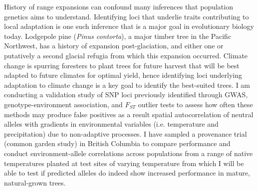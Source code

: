 	History of range expansions can confound many inferences that population genetics aims to understand. Identifying loci that underlie traits contributing to local adaptation is one such inference that is a major goal in evolutionary biology today. Lodgepole pine (\emph{Pinus contorta}), a major timber tree in the Pacific Northwest, has a history of expansion post-glaciation, and either one or putatively a second glacial refugia from which this expansion occurred. Climate change is spurring foresters to plant trees for future harvest that will be best adapted to future climates for optimal yield, hence identifying loci underlying adaptation to climate change is a key goal to identify the best-suited trees. I am conducting a validation study of SNP loci previously identified through GWAS, genotype-environment association, and $F_{ST}$ outlier tests to assess how often these methods may produce false positives as a result spatial autocorrelation of neutral alleles with gradients in environmental variables (i.e. temperature and precipitation) due to non-adaptive processes. I have sampled a provenance trial (common garden study) in British Columbia to compare performance and conduct environment-allele correlations across populations from a range of native temperatures planted at test sites of varying temperature from which I will be able to test if predicted alleles do indeed show increased performance in mature, natural-grown trees.
	


